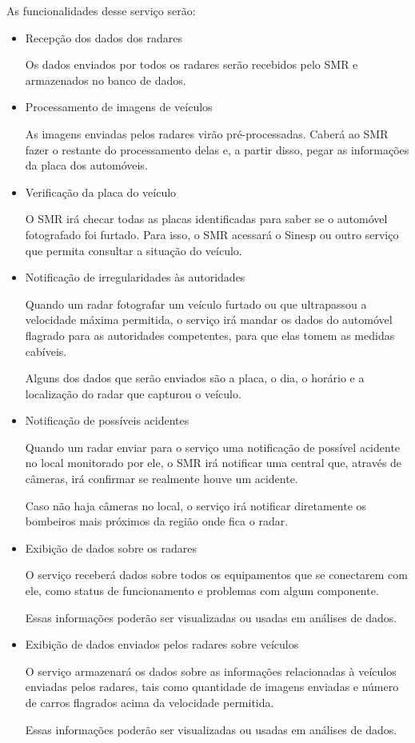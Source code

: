 As funcionalidades desse serviço serão:

\begin{itemize}
\item{Recepção dos dados dos radares}

Os dados enviados por todos os radares serão recebidos pelo SMR e armazenados no banco de dados.

\item{Processamento de imagens de veículos}

As imagens enviadas pelos radares virão pré-processadas. Caberá ao SMR fazer o restante do processamento delas e, a partir disso, pegar as informações da placa dos automóveis.

\item{Verificação da placa do veículo}

O SMR irá checar todas as placas identificadas para saber se o automóvel fotografado foi furtado. Para isso, o SMR acessará o Sinesp ou outro serviço que permita consultar a situação do veículo.

\item{Notificação de irregularidades às autoridades}

Quando um radar fotografar um veículo furtado ou que ultrapassou a velocidade máxima permitida, o serviço irá mandar os dados do automóvel flagrado para as autoridades competentes, para que elas tomem as medidas cabíveis.

Alguns dos dados que serão enviados são a placa, o dia, o horário e a localização do radar que capturou o veículo.

\item{Notificação de possíveis acidentes}

Quando um radar enviar para o serviço uma notificação de possível acidente no local monitorado por ele, o SMR irá notificar uma central que, através de câmeras, irá confirmar se realmente houve um acidente.

Caso não haja câmeras no local, o serviço irá notificar diretamente os bombeiros mais próximos da região onde fica o radar.

\item{Exibição de dados sobre os radares}

O serviço receberá dados sobre todos os equipamentos que se conectarem com ele, como status de funcionamento e problemas com algum componente.

Essas informações poderão ser visualizadas ou usadas em análises de dados.

\item{Exibição de dados enviados pelos radares sobre veículos}

O serviço armazenará os dados sobre as informações relacionadas à veículos enviadas pelos radares, tais como quantidade de imagens enviadas e número de carros flagrados acima da velocidade permitida.

Essas informações poderão ser visualizadas ou usadas em análises de dados.
\end{itemize}

